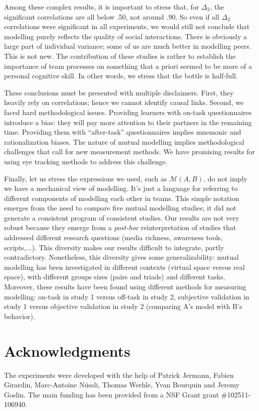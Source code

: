 \documentclass[twocolumn]{article}
\newcommand{\gmodel}[2]{{$\mathcal{M}(#1, #2)$}}
\begin{document}
Among these complex results, it is important to stress that, for $\Delta_2$, the
significant correlations are all below .50, not around .90.  So even if all
$\Delta_2$ correlations were significant in all experiments, we would still not
conclude that modelling purely reflects the quality of social interactions.
There is obviously a large part of individual variance; some of us are much
better in modelling peers. This is not new. The contribution of these studies is
rather to establish the importance of team processes on something that a priori
seemed to be more of a personal cognitive skill.  In other words, we stress that
the bottle is half-full. 

These conclusions must be presented with multiple disclaimers. First, they
heavily rely on correlations; hence we cannot identify causal links. Second, we
faced hard methodological issues. Providing learners with on-task questionnaires
introduce a bias: they will pay more attention to their partners in the
remaining time. Providing them with ``after-task'' questionnaires implies mnemonic
and rationalization biases. The nature of mutual modelling implies methodological
challenges that call for new  measurement methods. We have promising results for
using eye tracking methods to address this challenge.

Finally, let us stress the expressions we used, such as \gmodel{A}{B}, do not
imply we have a mechanical view of modelling. It's just a language for referring
to different components of modelling each other in teams.  This simple notation
emerges from the need to compare five mutual modelling studies; it did not
generate a consistent program of consistent studies.  Our results are not very
robust because they emerge from a \emph{post-hoc} reinterpretation of studies
that addressed different research questions (media richness, awareness tools,
scripts,...). This diversity makes our results difficult to integrate, partly
contradictory. Nonetheless, this diversity gives some generalizability: mutual
modelling has been investigated in different contexts (virtual space versus real
space), with different groups sizes (pairs and triads) and different tasks.
Moreover, these results have been found using different methods for measuring
modelling: on-task in study 1 versus off-task in study 2, subjective validation
in study 1 versus objective validation in study 2 (comparing A's model with B's
behavior).

\section*{Acknowledgments}

The experiments were developed with the help of Patrick Jermann,  Fabien
Girardin, Marc-Antoine Nüssli, Thomas Werhle, Yvan Bourquin and  Jeremy Goslin.
The main funding has been provided from a NSF Grant grant \#102511-106940.



\end{document}
